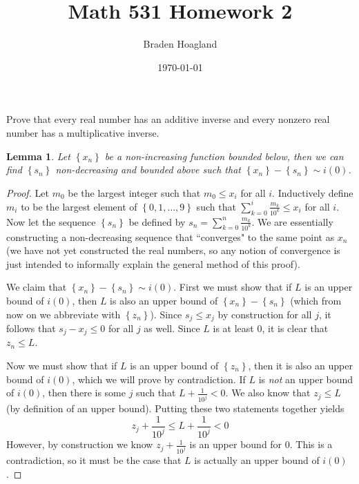 \documentclass[10pt]{amsart}
\theoremstyle{plain}
\newtheorem{lemma}[equation]{Lemma}
\newenvironment{exercise}[1]{%
  \renewcommand\themanualtheoreminner{#1}%
  \manualtheoreminner
}{\endmanualtheoreminner}
\theoremstyle{definition}
\newcommand{\<}{\langle}
\renewcommand{\>}{\rangle}
\begin{document}
%

\title{Math 531 Homework 2}
\author{Braden Hoagland}


\date{\today}

\maketitle



\begin{exercise}{i}
	Prove that every real number has an additive inverse and every nonzero real number has a multiplicative inverse.
\end{exercise}

\begin{lemma}\label{bruh}
	Let $\left\{ x_n \right\}$ be a non-increasing function bounded below, then we can find $\left\{ s_n \right\}$ non-decreasing and bounded above such that $ \left\{ x_n \right\}-\left\{ s_n \right\}\sim i(0)$.
\end{lemma}
\begin{proof}

Let $m_0$ be the largest integer such that $m_0 \leq x_i$ for all $i$. Inductively define $m_i$ to be the largest element of $\left\{ 0,1,\dots,9 \right\}$ such that $\sum_{k=0}^{i} \frac{m_k}{10^k} \leq x_i$ for all $i$. Now let the sequence $\left\{ s_n \right\}$ be defined by $s_n = \sum_{k=0}^{n} \frac{m_k}{10^k}$. We are essentially constructing a non-decreasing sequence that ``converges" to the same point as $x_n$ (we have not yet constructed the real numbers, so any notion of convergence is just intended to informally explain the general method of this proof).

We claim that $\left\{ x_n \right\} - \left\{ s_n \right\} \sim i(0)$. First we must show that if $L$ is an upper bound of $i(0)$, then $L$ is also an upper bound of $\left\{ x_n \right\} - \left\{ s_n \right\}$ (which from now on we abbreviate with $\left\{ z_n \right\}$). Since $s_j \leq x_j$ by construction for all $j$, it follows that $s_j - x_j \leq 0$ for all $j$ as well. Since $L$ is at least 0, it is clear that $z_n \leq L$.

Now we must show that if $L$ is an upper bound of $\left\{ z_n \right\}$, then it is also an upper bound of $i(0)$, which we will prove by contradiction. If $L$ is \textit{not} an upper bound of $i(0)$, then there is some $j$ such that $L + \frac{1}{10^j} < 0$. We also know that $z_j \leq L$ (by definition of an upper bound). Putting these two statements together yields
\[
z_j + \frac{1}{10^j} \leq L + \frac{1}{10^j} < 0
\]
However, by construction we know $z_j + \frac{1}{10^j} $ is an upper bound for 0. This is a contradiction, so it must be the case that $L$ is actually an upper bound of $i(0)$.
\end{proof}
\end{document}
